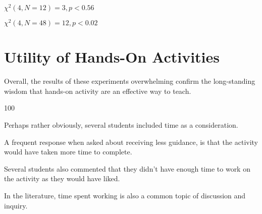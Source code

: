 



























$\chi^2(4, N=12)=3, p<0.56$



$\chi^2(4, N=48)=12, p<0.02$



























\section{Utility of Hands-On Activities}



    Overall, the results of these experiments overwhelming confirm the long-standing wisdom that hands-on activity are an effective way to teach. %



 100\    



    Perhaps rather obviously, several students included time as a consideration. %



A frequent response when asked about receiving less guidance, is that the activity would have taken more time to complete. %



Several students also commented that they didn't have enough time to work on the activity as they would have liked. %



In the literature, time spent working is also a common topic of discussion and inquiry. %



